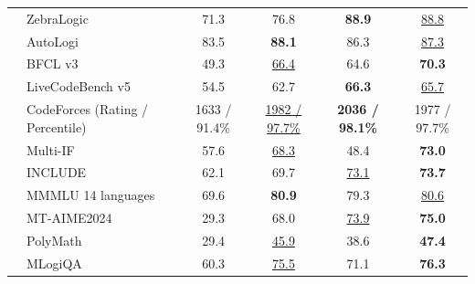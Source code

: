 \begin{table}[tbp]
{\begin{tabular}{@{}clcccc@{}}
& ZebraLogic & 71.3 & 76.8 & \textbf{88.9} & \underline{88.8} \\
& AutoLogi & 83.5 & \textbf{88.1} & 86.3 & \underline{87.3} \\
\midrule
{} & BFCL v3 & 49.3 & \underline{66.4} & 64.6 & \textbf{70.3} \\
& LiveCodeBench v5 & 54.5 & 62.7 & \textbf{66.3} & \underline{65.7} \\
& CodeForces {\tiny{(Rating / Percentile)}} & 1633 / 91.4\% & \underline{1982 / 97.7\%} & \textbf{2036 / 98.1\%} & 1977 / 97.7\% \\
\midrule
{} & Multi-IF & 57.6 & \underline{68.3} & 48.4 & \textbf{73.0} \\
& INCLUDE & 62.1 & 69.7 & \underline{73.1} & \textbf{73.7} \\
& MMMLU {\tiny{14 languages}} & 69.6 & \textbf{80.9} & 79.3 & \underline{80.6} \\
& MT-AIME2024 & 29.3 & 68.0 & \underline{73.9} & \textbf{75.0} \\
& PolyMath & 29.4 & \underline{45.9} & 38.6 & \textbf{47.4} \\
& MLogiQA & 60.3 & \underline{75.5} & 71.1 & \textbf{76.3} \\
\bottomrule
\end{tabular}
}
\vspace{1mm}
\end{table}

